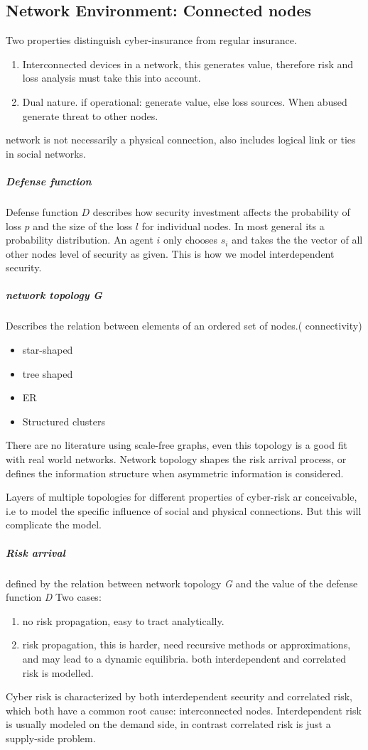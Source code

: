 \subsection{Network Environment: Connected nodes}
Two properties distinguish cyber-insurance from regular insurance.
\begin{enumerate}
\item Interconnected devices in a network, this generates value, therefore risk and loss analysis must take this into account. 
\item Dual nature. if operational: generate value, else loss sources. When abused generate threat to other nodes.
\end{enumerate}
network is not necessarily  a physical connection, also includes logical link or ties in social networks.
\subparagraph{Defense function}
Defense function $D$ describes how security investment affects the probability of loss $p $ and the size of the loss  $l $ for individual nodes.  In most general its a probability distribution.
An agent $i$ only chooses $s_{i}$ 
and takes the the vector of all other nodes level of security as given. 
This is how we model interdependent security. 

\subparagraph{network topology G}
Describes the relation between elements of an ordered set of nodes.( connectivity)
\begin{itemize}[topsep=-1em,parsep=0em,itemsep=0em] 
\item star-shaped \item tree shaped \item ER \item Structured clusters
\end{itemize}
There are no literature using scale-free graphs, even this topology is a good fit with real world networks.
Network topology shapes the risk arrival process, or defines the information structure when asymmetric
 information is considered.

Layers of multiple topologies for different properties of cyber-risk ar conceivable, 
i.e to model the specific influence of social and physical connections. But this will complicate the model.

\subparagraph{Risk arrival}
defined by the relation between network topology \textit{G} and the value of the defense
 function \textit{D}
 Two cases:
 \begin{enumerate}
 \item no risk propagation, easy to tract analytically.
 \item risk propagation, this is harder, need recursive methods or approximations, 
 and may lead to a dynamic equilibria. both interdependent and correlated risk is modelled. 
 \end{enumerate} 
Cyber risk is characterized by both interdependent security and correlated risk, 
which both have a common root cause: interconnected nodes. 
Interdependent risk is usually modeled on the demand side,
 in contrast correlated risk is just a supply-side problem.

